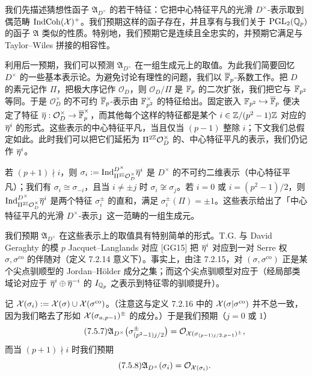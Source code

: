 我们先描述猜想性函子 $\mathfrak A_{D^\times}$ 的若干特征：它把中心特征平凡的光滑 $D^\times$-表示取到偶范畴 $\operatorname{IndCoh}(\mathcal{X})^{+}$。我们预期这样的函子存在，并且享有与我们关于 $\mathrm{PGL}_2(\mathbb{Q}_p)$ 的函子 $\mathfrak A$ 类似的性质。特别地，我们预期它是连续且全忠实的，并预期它满足与 Taylor--Wiles 拼接的相容性。

利用后一预期，我们可以预测 $\mathfrak A_{D^\times}$ 在一组生成元上的取值。为此我们简要回忆 $D^\times$ 的一些基本表示论。为避免讨论有理性的问题，我们以 $\overline{\mathbb{F}}_p$-系数工作。把 $D$ 的素元记作 $\Pi$，把极大序记作 $\mathcal O_D$，则 $\mathcal O_D/\Pi$ 是 $\mathbb{F}_p$ 的二次扩张，我们把它与 $\mathbb{F}_{p^2}$ 等同。于是 $\mathcal O_D^\times$ 的不可约 $\overline{\mathbb{F}}_p$-表示由 $\mathbb{F}_{p^2}^\times$ 的特征给出。固定嵌入 $\mathbb{F}_{p^2}\hookrightarrow\overline{\mathbb{F}}_p$ 便决定了特征 $\overline{\eta}:\mathcal O_D^\times\to\overline{\mathbb{F}}_p^\times$，而其他每个这样的特征都是某个 $i\in\mathbb{Z}/(p^2-1)\mathbb{Z}$ 对应的 $\overline{\eta}^{i}$ 的形式。这些表示的中心特征平凡，当且仅当 $(p-1)$ 整除 $i$；下文我们总假定如此。此时我们可以把它们延拓为 $\Pi^{2\mathbb{Z}}\mathcal O_D^\times$ 的、中心特征平凡的表示，我们仍记作 $\overline{\eta}^{i}$。

若 $(p+1)\nmid i$，则 $\sigma_i:=\mathrm{Ind}_{\Pi^{2\mathbb{Z}}\mathcal O_D^\times}^{D^\times}\overline{\eta}^{i}$ 是 $D^\times$ 的不可约二维表示（中心特征平凡）；我们有 $\sigma_i\cong\sigma_{-i}$，且当 $i\ne\pm j$ 时 $\sigma_i\not\cong\sigma_j$。若 $i=0$ 或 $i=(p^2-1)/2$，则 $\mathrm{Ind}_{\Pi^{2\mathbb{Z}}\mathcal O_D^\times}^{D^\times}\overline{\eta}^{i}$ 是两个特征 $\sigma_i^{\pm}$ 的直和，满足 $\sigma_i^{\pm}(\Pi)=\pm1$。这些表示给出了「中心特征平凡的光滑 $D^\times$-表示」这一范畴的一组生成元。

我们预期 $\mathfrak A_{D^\times}$ 在这些表示上的取值具有特别简单的形式。T.G. 与 David Geraghty 的模 $p$ Jacquet--Langlands 对应 [GG15] 把 $\overline{\eta}^{i}$ 对应到一对 Serre 权 $\sigma,\sigma^{\mathrm{co}}$ 的伴随对（定义 7.2.14 意义下）。事实上，由注 7.2.15，对 $(\sigma,\sigma^{\mathrm{co}})$ 正是某个尖点驯顺型的 Jordan--Hölder 成分之集；而这个尖点驯顺型对应于（经局部类域论对应于 $\overline{\eta}^{i}\oplus\overline{\eta}^{-i}$ 的 $I_{\mathbb{Q}_p}$ 之表示到特征零的驯顺提升）。

记 $\mathcal{X}(\sigma_i):=\mathcal{X}(\sigma)\cup\mathcal{X}(\sigma^{\mathrm{co}})$。（注意这与定义 7.2.16 中的 $\mathcal{X}(\sigma|\sigma^{\mathrm{co}})$ 并不总一致，因为我们略去了形如 $\mathcal{X}(\sigma_{a,p-1})^{\pm}$ 的成分。）于是我们预期（$j=0$ 或 $1$）
\begin{equation}\tag{7.5.7}\label{eq:a4-7-5-7}
\mathfrak A_{D^\times}\bigl(\sigma^{\pm}_{(p^2-1)j/2}\bigr)
=\mathcal{O}_{\mathcal{X}(\sigma_{(p-1)j/2,p-1})^{\pm}},
\end{equation}
而当 $(p+1)\nmid i$ 时我们预期
\begin{equation}\tag{7.5.8}\label{eq:a4-7-5-8}
\mathfrak A_{D^\times}(\sigma_i)=\mathcal{O}_{\mathcal{X}(\sigma_i)}.
\end{equation}

